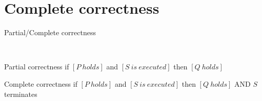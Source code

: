 \documentclass[aspectratio=169]{beamer}
\begin{document}




\section{Complete correctness}

\begin{frame}{Partial/Complete correctness}

~~\\[10mm]

\begin{alertblock}{Partial correctness}
  if $[P~holds]$ and $[S~is~executed]$ then $[Q~holds]$
\end{alertblock}

\begin{alertblock}{Complete correctness}
  if $[P~holds]$ and $[S~is~executed]$ then $[Q~holds]$ \alert{AND $S$ terminates}
\end{alertblock}

\pause
~

\end{frame}
\end{document}
